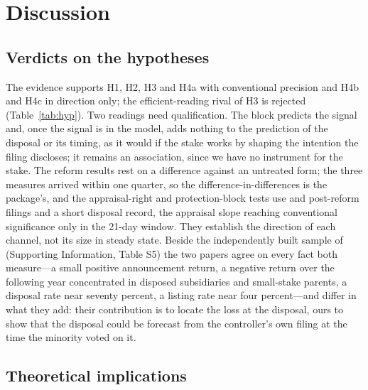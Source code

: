 \section{Discussion}\label{sec:discussion}

\subsection{Verdicts on the hypotheses}\label{sec:mapping}

The evidence supports H1, H2, H3 and H4a with conventional precision and H4b and H4c in direction only; the efficient-reading rival of H3 is rejected (Table~\ref{tab:hyp}). Two readings need qualification. The block predicts the signal and, once the signal is in the model, adds nothing to the prediction of the disposal or its timing, as it would if the stake works by shaping the intention the filing discloses; it remains an association, since we have no instrument for the stake. The reform results rest on a difference against an untreated form; the three measures arrived within one quarter, so the difference-in-differences is the package's, and the appraisal-right and protection-block tests use \AppraisalPrices{} and \ProtPostN{} post-reform filings and a short disposal record, the appraisal slope reaching conventional significance only in the 21-day window. They establish the direction of each channel, not its size in steady state. Beside the independently built sample of  (Supporting Information, Table S5) the two papers agree on every fact both measure---a small positive announcement return, a negative return over the following year concentrated in disposed subsidiaries and small-stake parents, a disposal rate near seventy percent, a listing rate near four percent---and differ in what they add: their contribution is to locate the loss at the disposal, ours to show that the disposal could be forecast from the controller's own filing at the time the minority voted on it.

\subsection{Theoretical implications}\label{sec:theoretical}

